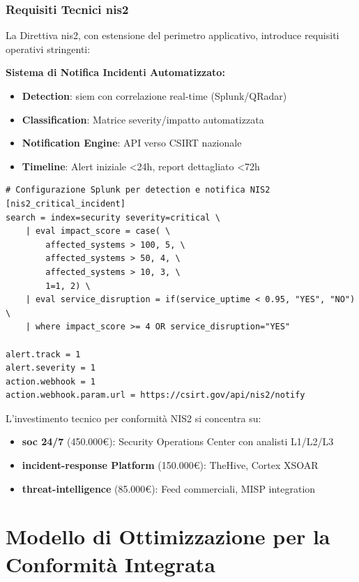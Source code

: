 \subsubsection{Requisiti Tecnici \gls{nis2}}

La Direttiva \gls{nis2}, con estensione del perimetro applicativo, introduce requisiti operativi stringenti\autocite{ENISA2024nis2}:

\textbf{Sistema di Notifica Incidenti Automatizzato:}
\begin{itemize}
    \item \textbf{Detection}: \gls{siem} con correlazione real-time (Splunk/QRadar)
    \item \textbf{Classification}: Matrice severity/impatto automatizzata
    \item \textbf{Notification Engine}: API verso CSIRT nazionale
    \item \textbf{Timeline}: Alert iniziale <24h, report dettagliato <72h
\end{itemize}

\begin{lstlisting}[caption={Pipeline Notifica \gls{nis2}},label={lst:nis2_notification}]
# Configurazione Splunk per detection e notifica NIS2
[nis2_critical_incident]
search = index=security severity=critical \
    | eval impact_score = case( \
        affected_systems > 100, 5, \
        affected_systems > 50, 4, \
        affected_systems > 10, 3, \
        1=1, 2) \
    | eval service_disruption = if(service_uptime < 0.95, "YES", "NO") \
    | where impact_score >= 4 OR service_disruption="YES"

alert.track = 1
alert.severity = 1
action.webhook = 1
action.webhook.param.url = https://csirt.gov/api/nis2/notify
\end{lstlisting}

L'investimento tecnico per conformità NIS2 si concentra su:
\begin{itemize}
    \item \textbf{\gls{soc} 24/7} (450.000€): Security Operations Center con analisti L1/L2/L3
    \item \textbf{\gls{incident-response} Platform} (150.000€): TheHive, Cortex XSOAR
    \item \textbf{\gls{threat-intelligence}} (85.000€): Feed commerciali, MISP integration
\end{itemize}
\section{\texorpdfstring{\textbf{Modello di Ottimizzazione per la Conformità Integrata}}{4.3 - Modello di Ottimizzazione per la Conformità Integrata}}

